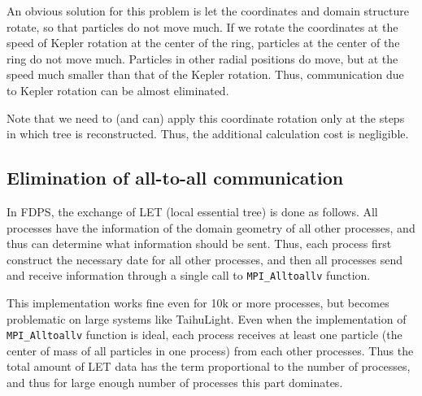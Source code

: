 \documentclass[oribibl]{llncs}
\begin{document}
An obvious solution for this problem is let the coordinates and domain
structure rotate, so that particles do not move much. If we rotate the
coordinates at the speed of Kepler rotation at the center of the ring,
particles at the center of the ring do not move much. Particles in
other radial positions do move, but at the speed much smaller than
that of the Kepler rotation. Thus, communication due to Kepler
rotation can be almost eliminated.

Note that we need to (and can) apply this coordinate rotation only at
the steps in which tree is reconstructed. Thus, the additional
calculation cost is negligible.

\subsection{Elimination of all-to-all communication}
\label{subsec:exlet}



In FDPS, the exchange of LET (local essential tree) is done as
follows. All processes have the information of the domain geometry of
all other processes, and thus can determine what information should be
sent. Thus, each process first construct the necessary date for all
other processes, and then all processes send and receive information
through a single call to {\tt MPI\_Alltoallv} function.

This implementation works fine even for 10k or more processes, but
becomes problematic on large systems like TaihuLight. Even when the
implementation of {\tt MPI\_Alltoallv} function is ideal, each process
receives at least one particle (the center of mass of all particles in
one process) from each other processes. Thus the total amount of LET
data has the term proportional to the number of processes, and thus
for large enough number of processes this part dominates.
\end{document}

